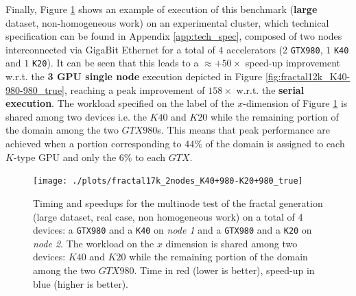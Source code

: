 Finally, Figure \ref{fig:fractal17k_2nodes_K40+980-K20+980_true} shows an example of execution of this benchmark (\textbf{large} dataset, non-homogeneous work) on an experimental cluster, which technical specification can be found in Appendix \ref{app:tech_spec}, composed of two nodes interconnected via GigaBit Ethernet for a total of $4$ accelerators ($2$ \texttt{GTX980}, $1$ \texttt{K40} and $1$ \texttt{K20}). It can be seen that this leads to a  $\approx +50 \times$ speed-up improvement w.r.t. the \textbf{3 GPU single node} execution depicted in Figure \ref{fig:fractal12k_K40-980-980_true}, reaching  a peak improvement  of $158 \times$ w.r.t. the \textbf{serial execution}. The workload  specified on the label of the $x$-dimension of Figure \ref{fig:fractal17k_2nodes_K40+980-K20+980_true} is shared among two devices i.e. the $K40$ and $K20$ while the remaining portion of the domain among the two $GTX980$s. This means that peak performance are achieved when a portion corresponding to $44\%$ of the domain is assigned to each $K$-type GPU and only the $6\%$ to each $GTX$.
\begin{figure}
	\texttt{[image: ./plots/fractal17k\_2nodes\_K40+980-K20+980\_true]}
	\caption[Timing and speedup for the fractal generation benchmark on 4 devices on 2 nodes.]{Timing and speedups for the multinode test of the fractal generation (large dataset, real case, non homogeneous work) on a total of 4 devices: a \texttt{GTX980} and a \texttt{K40} on \textit{node 1} and a \texttt{GTX980} and a \texttt{K20} on \textit{node 2}. The workload on the $x$ dimension is shared among two devices: $K40$ and $K20$ while the remaining portion of the domain among the two $GTX980$. Time in red (lower is better), speed-up in blue (higher is better).}
	\label{fig:fractal17k_2nodes_K40+980-K20+980_true}
\end{figure}

